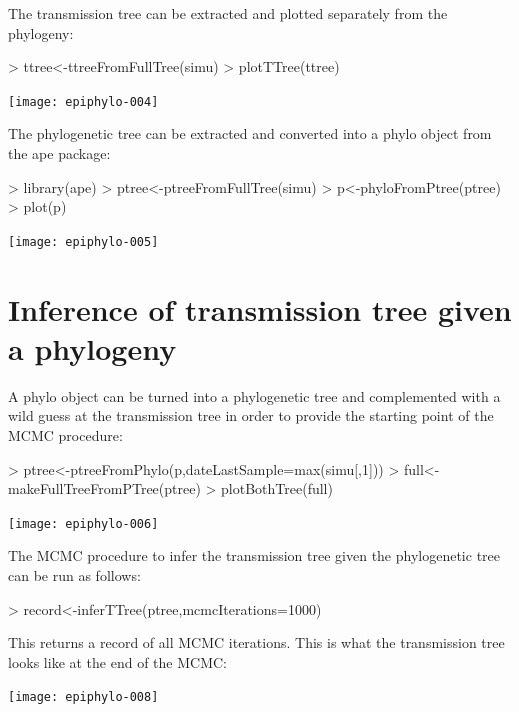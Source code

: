 \documentclass[a4paper]{article}
\begin{document}
The transmission tree can be extracted and plotted separately from the phylogeny:

\begin{Schunk}
\begin{Sinput}
> ttree<-ttreeFromFullTree(simu)
> plotTTree(ttree)
\end{Sinput}
\end{Schunk}
\texttt{[image: epiphylo-004]}

The phylogenetic tree can be extracted and converted into a phylo object from the ape package:

\begin{Schunk}
\begin{Sinput}
> library(ape)
> ptree<-ptreeFromFullTree(simu)
> p<-phyloFromPtree(ptree)
> plot(p)
\end{Sinput}
\end{Schunk}
\texttt{[image: epiphylo-005]}

\section{Inference of transmission tree given a phylogeny}

A phylo object can be turned  into a phylogenetic tree and complemented with a wild guess at the transmission tree in order to provide the starting point of the MCMC procedure:

\begin{Schunk}
\begin{Sinput}
> ptree<-ptreeFromPhylo(p,dateLastSample=max(simu[,1]))
> full<-makeFullTreeFromPTree(ptree)
> plotBothTree(full)
\end{Sinput}
\end{Schunk}
\texttt{[image: epiphylo-006]}

The MCMC procedure to infer the transmission tree given the phylogenetic tree can be run as follows:

\begin{Schunk}
\begin{Sinput}
> record<-inferTTree(ptree,mcmcIterations=1000)
\end{Sinput}
\end{Schunk}

This returns a record of all MCMC iterations. This is what the transmission tree looks like at the end of the MCMC:

\begin{Schunk}
\end{Schunk}
\texttt{[image: epiphylo-008]}
\end{document}
